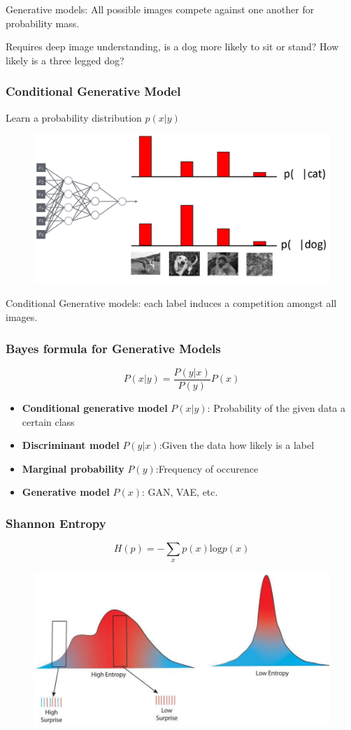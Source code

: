 Generative models: All possible images compete against one another for probability mass.

Requires deep image understanding, is a dog more likely to sit or stand? How likely is a three legged dog?

\subsubsection{Conditional Generative Model}
Learn a probability distribution \(p(x|y)\)

\begin{figure}[!h]
    \includegraphics[width = \columnwidth]{figures/GenAI1/ConditionalGenerativeModel.png}
\end{figure}
Conditional Generative models: each label induces a competition amongst all images.

\subsubsection{Bayes formula for Generative Models}
\[
P(x|y) = \frac{P(y|x)}{P(y)}P(x)
\]

\begin{itemize}
    \item \textbf{Conditional generative model} \(P(x|y)\): Probability of the given data a certain class
    \item \textbf{Discriminant model} \(P(y|x)\):Given the data how likely is a label
    \item \textbf{Marginal probability} \(P(y)\):Frequency of occurence
    \item \textbf{Generative model} \(P(x)\): GAN, VAE, etc. 
\end{itemize}

\subsubsection{Shannon Entropy}
\[
H(p) = - \sum_x p(x) \text{log} p(x)
\]
\begin{figure}[!h]
    \includegraphics[width = \columnwidth]{figures/GenAI1/ShannonEntropy.png}
\end{figure}